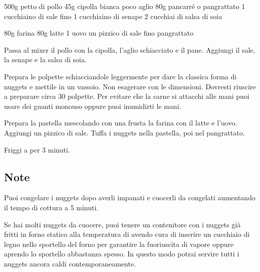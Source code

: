 \begin{ingreds}
	500g  petto di pollo 
	45g cipolla bianca 
	poco aglio
	80g pancarré o pangrattato 
	1 cucchiaino di sale fino
	1 cucchiaino di senape 
	2 cucchiai di salsa di soia 

\columnbreak
{}
	80g farina 
	80g latte 
	1 uovo 
	un pizzico di sale fino
	pangrattato 
\end{ingreds}

\begin{method}
Passa al mixer il pollo con la cipolla, l'aglio schiacciato e il pane. Aggiungi il sale, la senape e la salsa di soia.

Prepara le polpette schiacciandole leggermente per dare la classica forma di nuggets e mettile in un vassoio. Non esagerare con le dimensioni. Dovresti riuscire a preparare circa 30 polpette. Per evitare che la carne si attacchi alle mani puoi usare dei guanti monouso oppure puoi inumidirti le mani.

Prepara la pastella mescolando con una frusta la farina con il latte e l'uovo. Aggiungi un pizzico di sale. Tuffa i nuggets nella pastella, poi nel pangrattato.

Friggi a  per 3 minuti.

\end {method}

\subsection*{Note}
		Puoi congelare i nuggets dopo averli impanati e cuocerli da congelati aumentando il tempo di cottura a 5 minuti.

		Se hai molti nuggets da cuocere, puoi tenere un contenitore con i nuggets già fritti in forno statico alla temperatura di  avendo cura di inserire un cucchiaio di legno nello sportello del forno per garantire la fuoriuscita di vapore oppure aprendo lo sportello abbastanza spesso. In questo modo potrai servire tutti i nuggets ancora caldi contemporaneamente.



